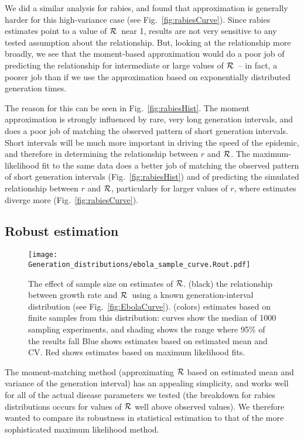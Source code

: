 \documentclass[12pt,]{article}
\newcommand{\RR}{\ensuremath{{\cal R}}}
\newcommand{\fref}[1]{Fig.~\ref{fig:#1}}
\begin{document}
We did a similar analysis for rabies, and found that approximation is generally harder for this high-variance case (see \fref{rabiesCurve}). Since rabies estimates point to a value of \RR\ near 1, results are not very sensitive to any tested assumption about the relationship. But, looking at the relationship more broadly, we see that the moment-based approximation would do a poor job of predicting the relationship for intermediate or large values of \RR\ -- in fact, a poorer job than if we use the approximation based on exponentially distributed generation times. 

The reason for this can be seen in \fref{rabiesHist}. The moment approximation is strongly influenced by rare, very long generation intervals, and does a poor job of matching the observed pattern of short generation intervals. Short intervals will be much more important in driving the speed of the epidemic, and therefore in determining the relationship between $r$ and \RR. The maximum-likelihood fit to the same data does a better job of matching the observed pattern of short generation intervals (\fref{rabiesHist}) and of predicting the simulated relationship between $r$ and \RR, particularly for larger values of $r$, where estimates diverge more (\fref{rabiesCurve}).

\subsection{Robust estimation}


\begin{figure}[htbp] \centering
	\texttt{[image: Generation\_distributions/ebola\_sample\_curve.Rout.pdf]}
\caption{
%
The effect of sample size on estimates of \RR.
(black) the relationship between growth rate and \RR~using a known generation-interval distribution (see \fref{EbolaCurve}).
(colors) estimates based on finite samples from this distribution: curves show the median of 1000 sampling experiments, and shading shows the range where 95\% of the results fall
Blue shows estimates based on estimated mean and CV.
Red shows estimates based on maximum likelihood fits.
%
}
	\label{fig:ebolaSample}
\end{figure}


The moment-matching method (approximating $\RR$ based on estimated mean and variance of the generation interval) has an appealing simplicity, and works well for all of the actual disease parameters we tested (the breakdown for rabies distributions occurs for values of $\RR$ well above observed values). We therefore wanted to compare its robustness in statistical estimation to that of the more sophisticated maximum likelihood method.
\end{document}
